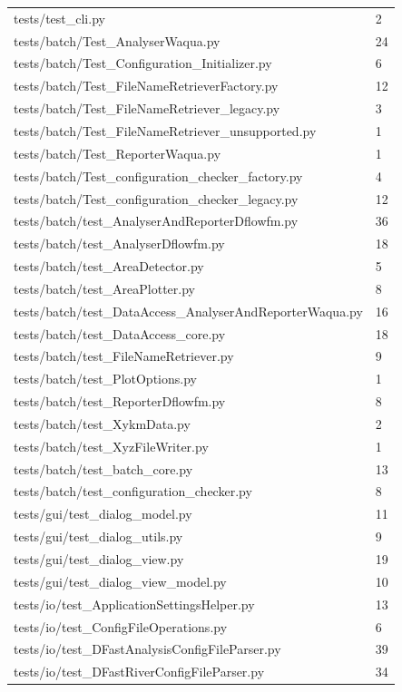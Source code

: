 \begin{longtable}{l|l}
tests/test\_cli.py & 2 \\
tests/batch/Test\_AnalyserWaqua.py & 24 \\
tests/batch/Test\_Configuration\_Initializer.py & 6 \\
tests/batch/Test\_FileNameRetrieverFactory.py & 12 \\
tests/batch/Test\_FileNameRetriever\_legacy.py & 3 \\
tests/batch/Test\_FileNameRetriever\_unsupported.py & 1 \\
tests/batch/Test\_ReporterWaqua.py & 1 \\
tests/batch/Test\_configuration\_checker\_factory.py & 4 \\
tests/batch/Test\_configuration\_checker\_legacy.py & 12 \\
tests/batch/test\_AnalyserAndReporterDflowfm.py & 36 \\
tests/batch/test\_AnalyserDflowfm.py & 18 \\
tests/batch/test\_AreaDetector.py & 5 \\
tests/batch/test\_AreaPlotter.py & 8 \\
tests/batch/test\_DataAccess\_AnalyserAndReporterWaqua.py & 16 \\
tests/batch/test\_DataAccess\_core.py & 18 \\
tests/batch/test\_FileNameRetriever.py & 9 \\
tests/batch/test\_PlotOptions.py & 1 \\
tests/batch/test\_ReporterDflowfm.py & 8 \\
tests/batch/test\_XykmData.py & 2 \\
tests/batch/test\_XyzFileWriter.py & 1 \\
tests/batch/test\_batch\_core.py & 13 \\
tests/batch/test\_configuration\_checker.py & 8 \\
tests/gui/test\_dialog\_model.py & 11 \\
tests/gui/test\_dialog\_utils.py & 9 \\
tests/gui/test\_dialog\_view.py & 19 \\
tests/gui/test\_dialog\_view\_model.py & 10 \\
tests/io/test\_ApplicationSettingsHelper.py & 13 \\
tests/io/test\_ConfigFileOperations.py & 6 \\
tests/io/test\_DFastAnalysisConfigFileParser.py & 39 \\
tests/io/test\_DFastRiverConfigFileParser.py & 34 \\

\end{longtable}
